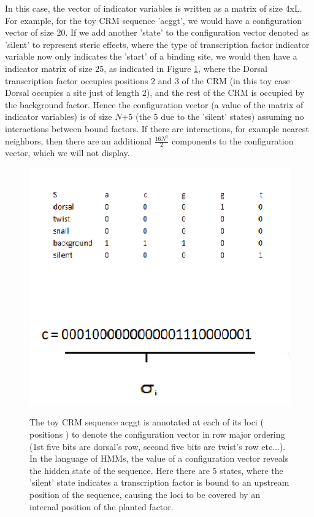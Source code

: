 In this case, the vector of indicator variables is written as a matrix of size 4xL.  For example, for the toy CRM sequence 'acggt', we would have a configuration vector of size 20.  If we add another 'state' to the configuration vector denoted as 'silent' to represent steric effects, where the type of transcription factor indicator variable now only indicates the 'start' of a binding site, we would then have a indicator matrix of size 25, as indicated in Figure \ref{configurationMatrixI}, where the Dorsal transcription factor occupies positions 2 and 3 of the CRM (in this toy case Dorsal occupies a site just of length 2), and the rest of the CRM is occupied by the background factor.  Hence the configuration vector (a value of the matrix of indicator variables) is of size $N$+5 (the 5  due to the 'silent' states) assuming no interactions between bound factors.  If there are interactions, for example nearest neighbors, then there are an additional $\frac{16N^2}{2}$ components to the configuration vector, which we will not display.
 
\begin{figure}
  \includegraphics[width=1\textwidth]{configurationMatrixIb}\\
  \caption{The toy CRM sequence acggt is annotated at each of its loci ( positions ) to denote the configuration vector in row major ordering (1st five bits are dorsal's row, second five bits are twist's row etc...).  In the language of HMMs, the value of a configuration vector reveals the hidden state of the sequence.  Here there are 5 states, where the 'silent' state indicates a transcription factor is bound to an upstream position of the sequence, causing the loci to be covered by an internal position of the planted factor.  }\label{configurationMatrixI}
\end{figure}

